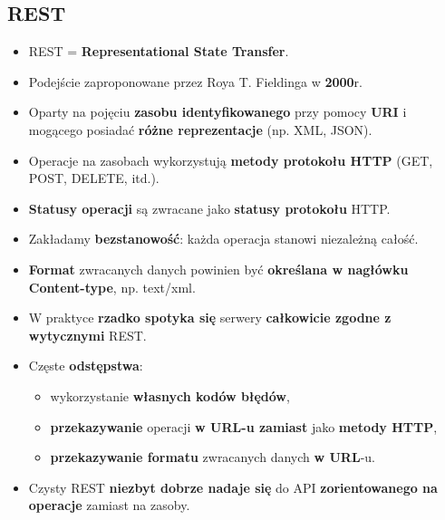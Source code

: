 \documentclass[../main.tex]{subfiles}
\begin{document}
    \subsection{REST}
    \begin{itemize}
        \item REST = \textbf{Representational State Transfer}.
        \item Podejście zaproponowane przez Roya T. Fieldinga w \textbf{2000}r.
        \item Oparty na pojęciu \textbf{zasobu identyfikowanego} przy pomocy \textbf{URI} i mogącego posiadać \textbf{różne reprezentacje} (np. XML, JSON).
        \item Operacje na zasobach wykorzystują \textbf{metody protokołu HTTP} (GET, POST, DELETE, itd.).
        \item \textbf{Statusy operacji} są zwracane jako \textbf{statusy protokołu} HTTP.
        \item Zakładamy \textbf{bezstanowość}: każda operacja stanowi niezależną całość.
        \item \textbf{Format} zwracanych danych powinien być \textbf{określana w nagłówku Content-type}, np. text/xml.
        \item W praktyce \textbf{rzadko spotyka się} serwery \textbf{całkowicie zgodne z wytycznymi} REST.
        \item Częste \textbf{odstępstwa}:
        \begin{itemize}
            \item wykorzystanie \textbf{własnych kodów błędów},
            \item \textbf{przekazywanie} operacji \textbf{w URL-u zamiast} jako \textbf{metody HTTP},
            \item \textbf{przekazywanie formatu} zwracanych danych \textbf{w URL}-u.
        \end{itemize}
        \item Czysty REST \textbf{niezbyt dobrze nadaje się} do API \textbf{zorientowanego na operacje} zamiast na zasoby.
    \end{itemize}
\end{document}
